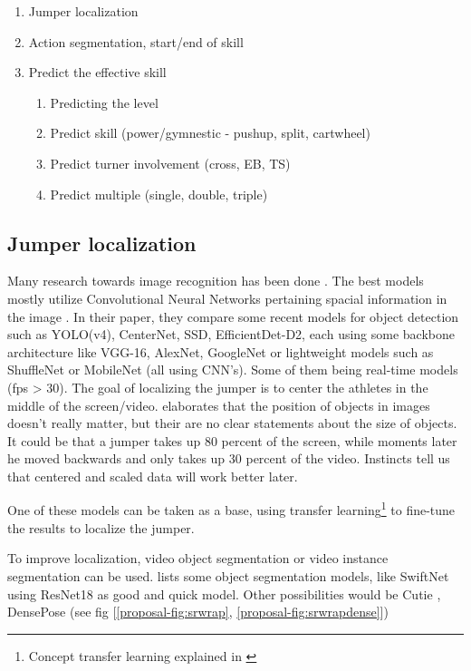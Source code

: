 \begin{enumerate}
    \item Jumper localization
    \item Action segmentation, start/end of skill
    \item Predict the effective skill
        \begin{enumerate}
            \item Predicting the level
            \item Predict skill (power/gymnestic - pushup, split, cartwheel)
            \item Predict turner involvement (cross, EB, TS)
            \item Predict multiple (single, double, triple)
        \end{enumerate}
\end{enumerate}

\subsection{Jumper localization}
\label{proposal-subsec:jumper localization}

Many research towards image recognition has been done \autocite{Zou_2023}. The best models mostly utilize Convolutional Neural Networks pertaining spacial information in the image \autocite{Zaidi_2021}. In their paper, they compare some recent models for object detection such as YOLO(v4), CenterNet, SSD, EfficientDet-D2, each using some backbone architecture like VGG-16, AlexNet, GoogleNet or lightweight models such as ShuffleNet or MobileNet (all using CNN's). Some of them being real-time models (fps > 30).
The goal of localizing the jumper is to center the athletes in the middle of the screen/video. \textcite{Bharadiya_2023} elaborates that the position of objects in images doesn't really matter, but their are no clear statements about the size of objects. It could be that a jumper takes up 80 percent of the screen, while moments later he moved backwards and only takes up 30 percent of the video. Instincts tell us that centered and scaled data will work better later.

One of these models can be taken as a base, using transfer learning\footnote{Concept transfer learning explained in \autocite{Bharadiya_2023}} to fine-tune the results to localize the jumper.

To improve localization, video object segmentation or video instance segmentation can be used. \textcite{Gao_2022} lists some object segmentation models, like SwiftNet \textcite{Wang_2021} using ResNet18 as good and quick model.
Other possibilities would be Cutie \autocite{Cheng_2023}, DensePose (see fig [\ref{proposal-fig:srwrap}, \ref{proposal-fig:srwrapdense}]) \autocite{Guler_2018}

